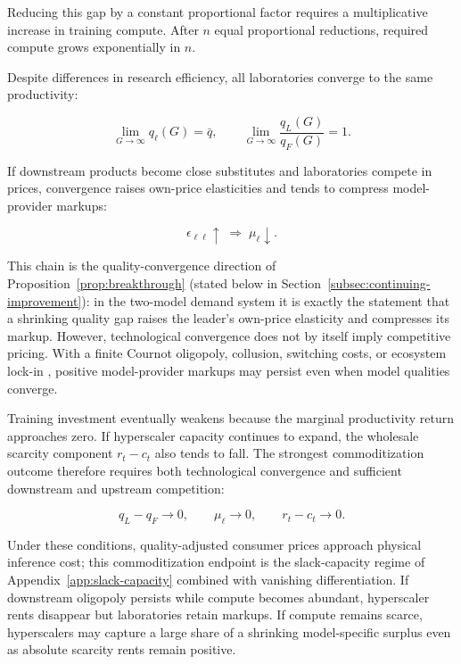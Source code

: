 \documentclass[11pt]{article}
\begin{document}
Reducing this gap by a constant proportional factor requires a multiplicative increase in training compute. After $n$ equal proportional reductions, required compute grows exponentially in $n$.

Despite differences in research efficiency, all laboratories converge to the same productivity:

\begin{equation}\lim_{G\rightarrow\infty}q_\ell(G)=\bar q,\qquad \lim_{G\rightarrow\infty}\frac{q_L(G)}{q_F(G)}=1.\end{equation}

If downstream products become close substitutes and laboratories compete in prices, convergence raises own-price elasticities and tends to compress model-provider markups:

\begin{equation}\epsilon_{\ell\ell}\uparrow\;\Longrightarrow\;\mu_\ell\downarrow.\end{equation}

This chain is the quality-convergence direction of Proposition~\ref{prop:breakthrough} (stated below in Section~\ref{subsec:continuing-improvement}): in the two-model demand system it is exactly the statement that a shrinking quality gap raises the leader's own-price elasticity and compresses its markup. However, technological convergence does not by itself imply competitive pricing. With a finite Cournot oligopoly, collusion, switching costs, or ecosystem lock-in \citep{klemperer1995}, positive model-provider markups may persist even when model qualities converge.

Training investment eventually weakens because the marginal productivity return approaches zero. If hyperscaler capacity continues to expand, the wholesale scarcity component $r_t-c_t$ also tends to fall. The strongest commoditization outcome therefore requires both technological convergence and sufficient downstream and upstream competition:

\begin{equation}q_L-q_F\rightarrow0,\qquad \mu_\ell\rightarrow0,\qquad r_t-c_t\rightarrow0.\end{equation}

Under these conditions, quality-adjusted consumer prices approach physical inference cost; this commoditization endpoint is the slack-capacity regime of Appendix~\ref{app:slack-capacity} combined with vanishing differentiation. If downstream oligopoly persists while compute becomes abundant, hyperscaler rents disappear but laboratories retain markups. If compute remains scarce, hyperscalers may capture a large share of a shrinking model-specific surplus even as absolute scarcity rents remain positive.
\end{document}
